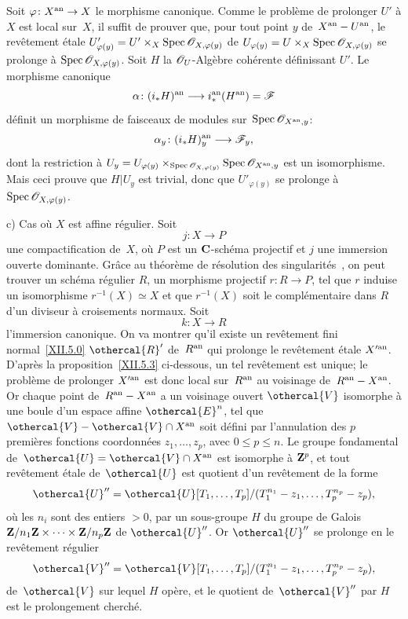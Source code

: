 Soit $\varphi\colon X^{\an}\to X$ le morphisme canonique. Comme le
probl\`eme de prolonger $U'$ \`a $X$ est local sur~$X$, il suffit
de prouver que, pour tout point $y$ de~$X^{\mathrm{an}}- U^{\mathrm{an}}$, le rev\^etement \'etale
$U'_{\varphi(y)}=U'\times_{X}\Spec\cal{O}_{X,\varphi(y)}$ de
$U_{\varphi(y)}=U\times_{X}\Spec\cal{O}_{X,\varphi(y)}$ se prolonge
\`a $\Spec\cal{O}_{X,\varphi(y)}$. Soit $H$ la
$\cal{O}_{U}$-Alg\`ebre coh\'erente d\'efinissant $U'$. Le
morphisme canonique
$$
\alpha\colon (i_*H)^{\an} \to i_*^{\an}(H^{\an})
=\cal{F}
$$
d\'efinit un morphisme de faisceaux de modules sur~$\Spec\cal{O}_{X^{\an},y}$:
$$
\alpha_{y}\colon (i_*H)^{\an}_{y} \to \cal{F}_{y}\quoi,
$$
dont la restriction \`a $U_{y}=U_{\varphi(y)}
\times_{\Spec\cal{O}_{X,\varphi(y)}}\Spec\cal{O}_{X^{\an},y}$ est un
isomorphisme. Mais ceci prouve que $H|U_{y}$ est trivial, donc que
$U'_{\varphi(y)}$ se prolonge \`a $\Spec\cal{O}_{X,\varphi(y)}$.

c) Cas o\`u $X$ est affine r\'egulier. Soit
$$
j\colon X\to P
$$
une compactification de~$X$, o\`u $P$ est un $\mathbf{C}$-sch\'ema
projectif et $j$ une immersion ouverte dominante. Gr\^ace au
th\'eor\`eme de r\'esolution des singularit\'es~\cite{XII.8}, on peut
trouver un sch\'ema r\'egulier $R$, un morphisme projectif
$r\colon R\to P$, tel que $r$ induise un isomorphisme $r^{-1}(X)\simeq
X$ et que $r^{-1}(X)$ soit le compl\'ementaire dans $R$ d'un
diviseur \`a croisements normaux. Soit
$$
k\colon X\to R
$$
l'immersion canonique. On va montrer qu'il existe un rev\^etement
fini normal~\eqref{XII.5.0} $\othercal{R}'$ de~$R^{\mathrm{an}}$ qui prolonge le
rev\^etement \'etale $X^{\prime\mathrm{an}}$. D'apr\`es la
proposition~\ref{XII.5.3} ci-dessous, un tel rev\^etement est
unique; le probl\`eme de prolonger $X^{\prime\mathrm{an}}$ est donc local sur~$R^{\mathrm{an}}$ au voisinage de~$R^{\mathrm{an}}- X^{\mathrm{an}}$. Or chaque
point de~$R^{\mathrm{an}}- X^{\mathrm{an}}$ a un voisinage ouvert
$\othercal{V}$ isomorphe \`a une boule d'un espace affine
$\othercal{E}^{n}$, tel que $\othercal{V}- \othercal{V}\cap X^{\an}$
soit d\'efini par l'annulation des $p$ premi\`eres fonctions
coordonn\'ees $z_{1},\dots,z_{p}$, avec $0\leq p\leq n$. Le groupe
fondamental de~$\othercal{U}=\othercal{V}\cap X^{\an}$ est isomorphe \`a
$\mathbf{Z}^{p}$, et tout rev\^etement \'etale de~$\othercal{U}$ est quotient
d'un rev\^etement de la forme
$$
\othercal{U}''= \othercal{U}[T_{1},\dots,T_{p}]/
(T_{1}^{n_{1}}-z_{1},\dots,T_{p}^{n_{p}}-z_{p})\quoi,
$$
o\`u les $n_{i}$ sont des entiers $>0$, par un sous-groupe $H$ du
groupe de Galois $\mathbf{Z}/n_{1}\mathbf{Z}\times\cdots\times\mathbf{Z}/n_{p}\mathbf{Z}$ de
$\othercal{U}''$. Or $\othercal{U}''$ se prolonge en le rev\^etement
r\'egulier
$$
\othercal{V}''= \othercal{V}[T_{1},\dots,T_{p}]/
(T_{1}^{n_{1}}-z_{1},\dots,T_{p}^{n_{p}}-z_{p})\quoi,
$$
de~$\othercal{V}$ sur lequel $H$ op\`ere, et le quotient de~$\othercal{V}''$
par $H$ est le prolongement cherch\'e.

